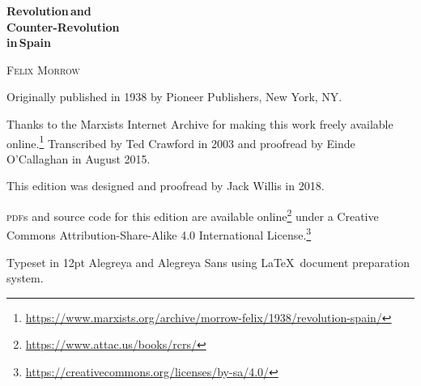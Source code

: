 \begin{titlepage}
	\setlength{\parindent}{0pt}
	
	\vspace*{\fill}
	
	{\sffamily\bfseries\fontsize{42}{42}\selectfont
		Revolution\,\textmd{and} \\
		Counter-Revolution \\
		\textmd{in}\,Spain
		\par}
	
	\vspace{63pt}
	
	{\fontsize{21}{21}\selectfont
		\textsc{Felix Morrow}
		\par}
	
	\vspace*{\fill}
	
\end{titlepage}

{
	\thispagestyle{empty}
	\setlength{\parindent}{0em}
	\setlength{\parskip}{0.5em}
	\sloppy
	
	\vspace*{\fill}
	\vspace*{\fill}
	
	Originally published in 1938 by Pioneer Publishers, New York, NY.
	
	Thanks to the Marxists Internet Archive
	for making this work freely available online.\footnote{\href{https://www.marxists.org/archive/morrow-felix/1938/revolution-spain/}{https://www.marxists.org/archive/morrow-felix/1938/revolution-spain/}}
	Transcribed by Ted Crawford in 2003
	and proofread by Einde O’Callaghan in August 2015.
	
	This edition was designed and proofread by Jack Willis in 2018.
	
	\textsc{pdf}s and source code for this edition are available online\footnote{\href{https://www.attac.us/books/rcrs/}{https://www.attac.us/books/rcrs/}}
	under a Creative Commons Attribution-Share-Alike 4.0 International License.\footnote{\href{https://creativecommons.org/licenses/by-sa/4.0/}{https://creativecommons.org/licenses/by-sa/4.0/}}
	
	Typeset in 12pt Alegreya and {\AlegreyaSans Alegreya Sans} using \LaTeX\ document preparation system.
	
	\vspace*{\fill}
}